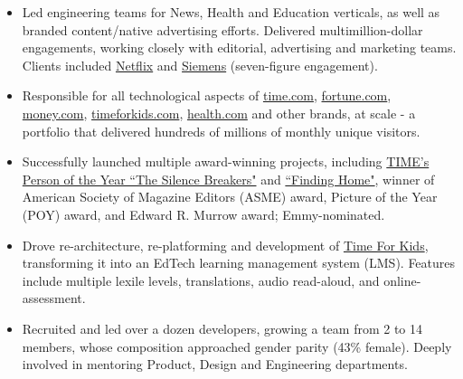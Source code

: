 \documentclass[a4paper,10pt]{memoir} %
\begin{document}
\begin{itemize}
	
	\item Led engineering teams for News, Health and Education verticals, as 
	well as branded content/native advertising efforts. Delivered 
	multimillion-dollar engagements, working closely with editorial, 
	advertising and marketing teams. Clients included \href{http://time.com/paid-content-from/netflix/dinnertime/}{Netflix} and \href{http://time.com/partner/siemens/innovation-starts-here/}{Siemens} (seven-figure 
	engagement).

	\item Responsible for all technological aspects of \href{http://time.com}
	{time.com}, \href{http://fortune.com}{fortune.com}, \href{http://money.com}{money.com}, \href{https://www.timeforkids.com}{
	timeforkids.com}, \href{https://www.health.com}{health.com} and other 
	brands, at scale - a portfolio that delivered hundreds of millions of 
	monthly unique visitors.

	\item Successfully launched multiple award-winning projects, including \href{http://time.com/time-person-of-the-year-2017-silence-breakers/}{
	TIME's Person of the Year ``The Silence Breakers"} and \href{http://time.com/finding-home/}{``Finding Home"}, winner of American 
	Society of Magazine Editors (ASME) award, Picture of the Year (POY) 
	award, and Edward R. Murrow award; Emmy-nominated.

	\item Drove re-architecture, re-platforming and development of \href{https://www.timeforkids}{Time For Kids}, transforming it into an EdTech 
	learning management system (LMS). Features include multiple lexile 
	levels, translations, audio read-aloud, and online-assessment.

	\item Recruited and led over a dozen developers, growing a team from 2 
	to 14 members, whose composition approached gender parity (43\% female). 
	Deeply involved in mentoring Product, Design 
	and Engineering departments. 
\end{itemize}
\Sep %
\end{document}

